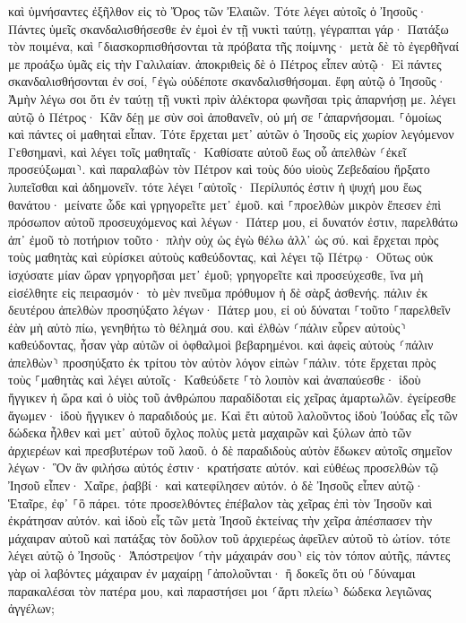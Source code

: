 \documentclass[twoside, 9pt]{extreport}
\begin{document}
καὶ ὑμνήσαντες ἐξῆλθον εἰς τὸ Ὄρος τῶν Ἐλαιῶν. 
Τότε λέγει αὐτοῖς ὁ Ἰησοῦς· Πάντες ὑμεῖς σκανδαλισθήσεσθε ἐν ἐμοὶ ἐν τῇ νυκτὶ ταύτῃ, γέγραπται γάρ· Πατάξω τὸν ποιμένα, καὶ ⸀διασκορπισθήσονται τὰ πρόβατα τῆς ποίμνης· 
μετὰ δὲ τὸ ἐγερθῆναί με προάξω ὑμᾶς εἰς τὴν Γαλιλαίαν. 
ἀποκριθεὶς δὲ ὁ Πέτρος εἶπεν αὐτῷ· Εἰ πάντες σκανδαλισθήσονται ἐν σοί, ⸀ἐγὼ οὐδέποτε σκανδαλισθήσομαι. 
ἔφη αὐτῷ ὁ Ἰησοῦς· Ἀμὴν λέγω σοι ὅτι ἐν ταύτῃ τῇ νυκτὶ πρὶν ἀλέκτορα φωνῆσαι τρὶς ἀπαρνήσῃ με. 
λέγει αὐτῷ ὁ Πέτρος· Κἂν δέῃ με σὺν σοὶ ἀποθανεῖν, οὐ μή σε ⸀ἀπαρνήσομαι. ⸀ὁμοίως καὶ πάντες οἱ μαθηταὶ εἶπαν. 
Τότε ἔρχεται μετ᾽ αὐτῶν ὁ Ἰησοῦς εἰς χωρίον λεγόμενον Γεθσημανὶ, καὶ λέγει τοῖς μαθηταῖς· Καθίσατε αὐτοῦ ἕως οὗ ἀπελθὼν ⸂ἐκεῖ προσεύξωμαι⸃. 
καὶ παραλαβὼν τὸν Πέτρον καὶ τοὺς δύο υἱοὺς Ζεβεδαίου ἤρξατο λυπεῖσθαι καὶ ἀδημονεῖν. 
τότε λέγει ⸀αὐτοῖς· Περίλυπός ἐστιν ἡ ψυχή μου ἕως θανάτου· μείνατε ὧδε καὶ γρηγορεῖτε μετ᾽ ἐμοῦ. 
καὶ ⸀προελθὼν μικρὸν ἔπεσεν ἐπὶ πρόσωπον αὐτοῦ προσευχόμενος καὶ λέγων· Πάτερ μου, εἰ δυνατόν ἐστιν, παρελθάτω ἀπ᾽ ἐμοῦ τὸ ποτήριον τοῦτο· πλὴν οὐχ ὡς ἐγὼ θέλω ἀλλ᾽ ὡς σύ. 
καὶ ἔρχεται πρὸς τοὺς μαθητὰς καὶ εὑρίσκει αὐτοὺς καθεύδοντας, καὶ λέγει τῷ Πέτρῳ· Οὕτως οὐκ ἰσχύσατε μίαν ὥραν γρηγορῆσαι μετ᾽ ἐμοῦ; 
γρηγορεῖτε καὶ προσεύχεσθε, ἵνα μὴ εἰσέλθητε εἰς πειρασμόν· τὸ μὲν πνεῦμα πρόθυμον ἡ δὲ σὰρξ ἀσθενής. 
πάλιν ἐκ δευτέρου ἀπελθὼν προσηύξατο λέγων· Πάτερ μου, εἰ οὐ δύναται ⸀τοῦτο ⸀παρελθεῖν ἐὰν μὴ αὐτὸ πίω, γενηθήτω τὸ θέλημά σου. 
καὶ ἐλθὼν ⸂πάλιν εὗρεν αὐτοὺς⸃ καθεύδοντας, ἦσαν γὰρ αὐτῶν οἱ ὀφθαλμοὶ βεβαρημένοι. 
καὶ ἀφεὶς αὐτοὺς ⸂πάλιν ἀπελθὼν⸃ προσηύξατο ἐκ τρίτου τὸν αὐτὸν λόγον εἰπὼν ⸀πάλιν. 
τότε ἔρχεται πρὸς τοὺς ⸀μαθητὰς καὶ λέγει αὐτοῖς· Καθεύδετε ⸀τὸ λοιπὸν καὶ ἀναπαύεσθε· ἰδοὺ ἤγγικεν ἡ ὥρα καὶ ὁ υἱὸς τοῦ ἀνθρώπου παραδίδοται εἰς χεῖρας ἁμαρτωλῶν. 
ἐγείρεσθε ἄγωμεν· ἰδοὺ ἤγγικεν ὁ παραδιδούς με. 
Καὶ ἔτι αὐτοῦ λαλοῦντος ἰδοὺ Ἰούδας εἷς τῶν δώδεκα ἦλθεν καὶ μετ᾽ αὐτοῦ ὄχλος πολὺς μετὰ μαχαιρῶν καὶ ξύλων ἀπὸ τῶν ἀρχιερέων καὶ πρεσβυτέρων τοῦ λαοῦ. 
ὁ δὲ παραδιδοὺς αὐτὸν ἔδωκεν αὐτοῖς σημεῖον λέγων· Ὃν ἂν φιλήσω αὐτός ἐστιν· κρατήσατε αὐτόν. 
καὶ εὐθέως προσελθὼν τῷ Ἰησοῦ εἶπεν· Χαῖρε, ῥαββί· καὶ κατεφίλησεν αὐτόν. 
ὁ δὲ Ἰησοῦς εἶπεν αὐτῷ· Ἑταῖρε, ἐφ᾽ ⸀ὃ πάρει. τότε προσελθόντες ἐπέβαλον τὰς χεῖρας ἐπὶ τὸν Ἰησοῦν καὶ ἐκράτησαν αὐτόν. 
καὶ ἰδοὺ εἷς τῶν μετὰ Ἰησοῦ ἐκτείνας τὴν χεῖρα ἀπέσπασεν τὴν μάχαιραν αὐτοῦ καὶ πατάξας τὸν δοῦλον τοῦ ἀρχιερέως ἀφεῖλεν αὐτοῦ τὸ ὠτίον. 
τότε λέγει αὐτῷ ὁ Ἰησοῦς· Ἀπόστρεψον ⸂τὴν μάχαιράν σου⸃ εἰς τὸν τόπον αὐτῆς, πάντες γὰρ οἱ λαβόντες μάχαιραν ἐν μαχαίρῃ ⸀ἀπολοῦνται· 
ἢ δοκεῖς ὅτι οὐ ⸀δύναμαι παρακαλέσαι τὸν πατέρα μου, καὶ παραστήσει μοι ⸂ἄρτι πλείω⸃ δώδεκα λεγιῶνας ἀγγέλων; 
\end{document}
